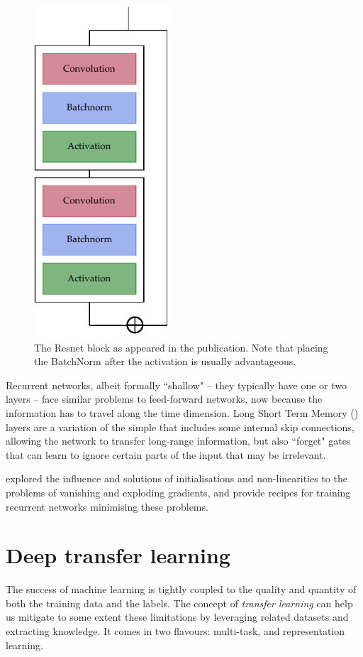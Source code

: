 \begin{figure}[!htb]
	\centering
	\includegraphics[width=0.45\textwidth]{machine_learning/figures/resnet}
	\caption{The Resnet block as appeared in the publication.
	Note that placing the BatchNorm after the activation is usually advantageous.}\label{fig:resnet}
\end{figure}

Recurrent networks,  albeit formally ``shallow" -- they typically have one or two layers -- face similar problems to feed-forward networks, now because the information has to travel along the time dimension.
Long Short Term Memory (\LSTM) layers are a variation of the simple \RNN{} that includes some internal skip connections, allowing the network to transfer long-range information, but also ``forget" gates that can learn to ignore certain parts of the input that may be irrelevant.

\citet{difficult_recurrent} explored the influence and solutions of initialisations and non-linearities to the problems of vanishing and exploding gradients, and provide recipes for training recurrent networks minimising these problems.


\section{Deep transfer learning}\label{sec:transfer}
The success of machine learning is tightly coupled to the quality and quantity of both the training data and the labels.
The concept of \emph{transfer learning} can help us mitigate to some extent these limitations by leveraging related datasets and extracting knowledge.
It comes in two flavours: multi-task, and representation learning.

